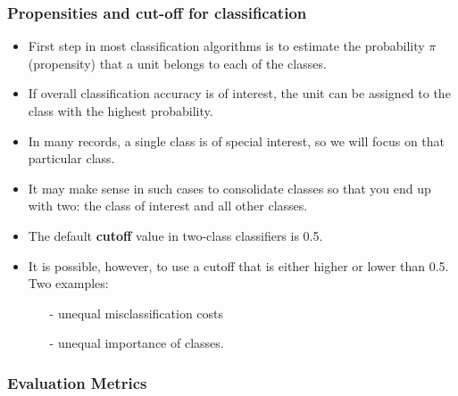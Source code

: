 \documentclass[compress]{beamer}
\begin{document}
\begin{frame}
\frametitle{Propensities and cut-off for classification}
\begin{itemize}
  \item First step in most classification algorithms is to estimate the probability $\pi$ (propensity) that
a unit belongs to each of the classes.
  \item If overall classification accuracy is of interest, the
unit can be assigned to the class with the highest probability.
  \item In many records,
a single class is of special interest, so we will focus on that particular class.
  \item It may make sense in such cases to consolidate classes so that you end up
with two: the class of interest and all other classes.
\item The default \textbf{cutoff} value in two-class classifiers is 0.5.
\item It is possible, however, to use a cutoff that is either higher or
lower than 0.5. Two examples:
\begin{itemize}\item[-] unequal misclassification costs \item[-] unequal importance of classes.
\end{itemize}
\end{itemize}
\end{frame}




\begin{frame}	\frametitle{Evaluation Metrics}

 \vspace{.5in}
\end{frame}
\end{document}
